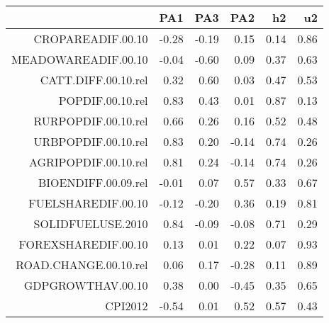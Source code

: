 \begin{table}[ht]
\centering
\begin{tabular}{rrrrrr}
  \hline
 & PA1 & PA3 & PA2 & h2 & u2 \\ 
  \hline
CROPAREADIF.00.10 & -0.28 & -0.19 & 0.15 & 0.14 & 0.86 \\ 
  MEADOWAREADIF.00.10 & -0.04 & -0.60 & 0.09 & 0.37 & 0.63 \\ 
  CATT.DIFF.00.10.rel & 0.32 & 0.60 & 0.03 & 0.47 & 0.53 \\ 
  POPDIF.00.10.rel & 0.83 & 0.43 & 0.01 & 0.87 & 0.13 \\ 
  RURPOPDIF.00.10.rel & 0.66 & 0.26 & 0.16 & 0.52 & 0.48 \\ 
  URBPOPDIF.00.10.rel & 0.83 & 0.20 & -0.14 & 0.74 & 0.26 \\ 
  AGRIPOPDIF.00.10.rel & 0.81 & 0.24 & -0.14 & 0.74 & 0.26 \\ 
  BIOENDIFF.00.09.rel & -0.01 & 0.07 & 0.57 & 0.33 & 0.67 \\ 
  FUELSHAREDIF.00.10 & -0.12 & -0.20 & 0.36 & 0.19 & 0.81 \\ 
  SOLIDFUELUSE.2010 & 0.84 & -0.09 & -0.08 & 0.71 & 0.29 \\ 
  FOREXSHAREDIF.00.10 & 0.13 & 0.01 & 0.22 & 0.07 & 0.93 \\ 
  ROAD.CHANGE.00.10.rel & 0.06 & 0.17 & -0.28 & 0.11 & 0.89 \\ 
  GDPGROWTHAV.00.10 & 0.38 & 0.00 & -0.45 & 0.35 & 0.65 \\ 
  CPI2012 & -0.54 & 0.01 & 0.52 & 0.57 & 0.43 \\ 
   \hline
\end{tabular}
\end{table}
